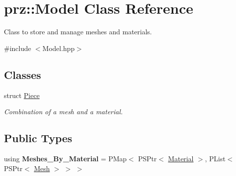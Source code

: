 \hypertarget{classprz_1_1_model}{}\section{prz\+::Model Class Reference}
\label{classprz_1_1_model}


Class to store and manage meshes and materials.  




{\ttfamily \#include $<$Model.\+hpp$>$}

\subsection*{Classes}
\begin{DoxyCompactItemize}
\item 
struct \mbox{\hyperlink{structprz_1_1_model_1_1_piece}{Piece}}
\begin{DoxyCompactList}\small\item\em Combination of a mesh and a material. \end{DoxyCompactList}\end{DoxyCompactItemize}
\subsection*{Public Types}
\begin{DoxyCompactItemize}
\item 
\mbox{\label{classprz_1_1_model_ab21531a0ebdcaa4dd12c8d224880a8d9}} 
using {\bfseries Meshes\+\_\+\+By\+\_\+\+Material} = P\+Map$<$ P\+S\+Ptr$<$ \mbox{\hyperlink{classprz_1_1_material}{Material}} $>$, P\+List$<$ P\+S\+Ptr$<$ \mbox{\hyperlink{classprz_1_1_mesh}{Mesh}} $>$ $>$ $>$
\end{DoxyCompactItemize}
